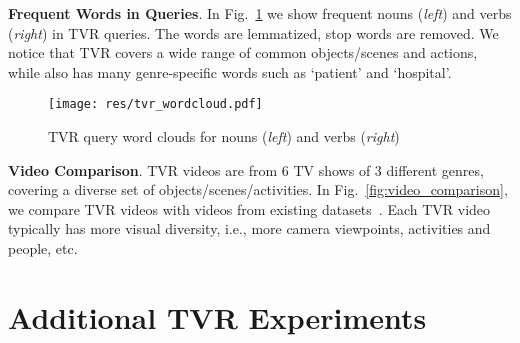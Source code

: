 \documentclass[runningheads]{llncs}
\begin{document}
\kern2mm
\noindent\textbf{Frequent Words in Queries}.
In Fig.~\ref{fig:tvr_wordclouds} we show frequent nouns (\textit{left}) and verbs (\textit{right}) in TVR queries. The words are lemmatized, stop words are removed. We notice that TVR covers a wide range of common objects/scenes and actions, while also has many genre-specific words such as `patient' and `hospital'.

\begin{figure}[!t]
  \centering
  \texttt{[image: res/tvr\_wordcloud.pdf]}
  \caption{TVR query word clouds for nouns (\textit{left}) and verbs (\textit{right})}
  \label{fig:tvr_wordclouds}
\end{figure}


\kern2mm
\noindent\textbf{Video Comparison}.
TVR videos are from 6 TV shows of 3 different genres, covering a diverse set of objects/scenes/activities. In Fig.~\ref{fig:video_comparison}, we compare TVR videos with videos from existing datasets~\cite{regneri2013grounding,gao2017tall,Krishna2017DenseCaptioningEI,anne2017localizing}. 
Each TVR video typically has more visual diversity, i.e., more camera viewpoints, activities and people, etc.

 \section{Additional TVR Experiments}\label{subsec:additional_tvr_experiments}
\end{document}
